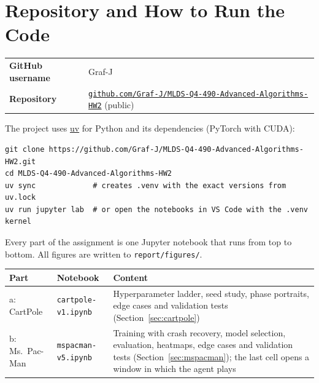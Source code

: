 \section{Repository and How to Run the Code}

\begin{tabularx}{\textwidth}{@{}lL@{}}
  \textbf{GitHub username} & Graf-J \\
  \textbf{Repository} & \href{https://github.com/Graf-J/MLDS-Q4-490-Advanced-Algorithms-HW2}{\texttt{github.com/Graf-J/MLDS-Q4-490-Advanced-Algorithms-HW2}} (public)
\end{tabularx}

The project uses \href{https://docs.astral.sh/uv/}{uv} for Python and its dependencies (PyTorch with CUDA):

\begin{lstlisting}
git clone https://github.com/Graf-J/MLDS-Q4-490-Advanced-Algorithms-HW2.git
cd MLDS-Q4-490-Advanced-Algorithms-HW2
uv sync             # creates .venv with the exact versions from uv.lock
uv run jupyter lab  # or open the notebooks in VS Code with the .venv kernel
\end{lstlisting}

Every part of the assignment is one Jupyter notebook that runs from top to bottom. All figures are written to \texttt{report/figures/}.

\begin{center}
\small
\begin{tabularx}{\textwidth}{@{}l l L@{}}
  \toprule
  \textbf{Part} & \textbf{Notebook} & \textbf{Content} \\
  \midrule
  a: CartPole & \texttt{cartpole-v1.ipynb} & Hyperparameter ladder, seed study, phase portraits, edge cases and validation tests (Section~\ref{sec:cartpole}) \\
  b: Ms.\ Pac-Man & \texttt{mspacman-v5.ipynb} & Training with crash recovery, model selection, evaluation, heatmaps, edge cases and validation tests (Section~\ref{sec:mspacman}); the last cell opens a window in which the agent plays \\
  \bottomrule
\end{tabularx}
\end{center}


